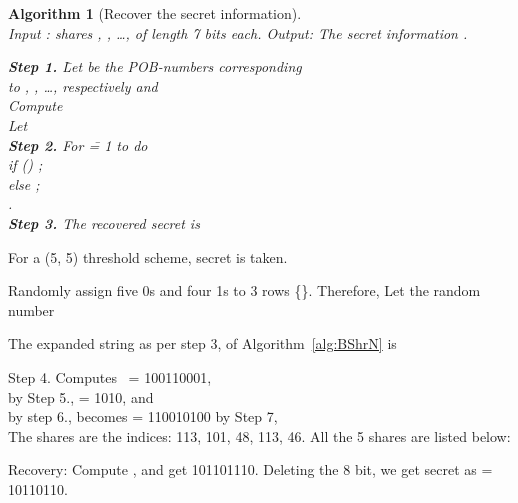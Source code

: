 \documentclass{llncs}
\newtheorem{algorithm}{Algorithm}
\begin{document}
\begin{algorithm}[Recover the  secret  information]\ \\
\label{alg:BRecN}
Input :  shares , , \ldots , of length 7 bits each. \newline
Output: The secret information  .\\
\begin{tabbing}
\textbf{Step 1.} \= Let  be the POB-numbers corresponding\\
                 \> to , , \ldots , respectively and   \\
\>Compute \\
\>Let   \\
\textbf{Step 2.} \> For  \= = 1 to  do \\
           \>\> if () ; \\
           \> else ; \\
       \>   .\\
\textbf{Step 3.}\> The recovered secret is 
\end{tabbing}
\end{algorithm}

\begin{example}
For a (5, 5) threshold scheme, secret  is taken.
\end{example}
Randomly assign five 0s and four 1s to 3 rows \{\}. Therefore,
 Let the random number 

The expanded string  as per step 3, of Algorithm~\ref{alg:BShrN} is  

Step 4. Computes \,  = 100110001, \\ by Step 5.,  = 1\raisebox{-0.6ex}{**}01\raisebox{-0.6ex}{***}0, and \\ by step 6.,  becomes = 110010100
by Step 7, \\

The shares are the indices: 113, 101, 48, 113, 46.
All the 5 shares are listed below:

Recovery: Compute , and get 101101110.
Deleting the 8\raisebox{0.6ex}{th} bit, we get secret as  = 10110110.
\end{document}
